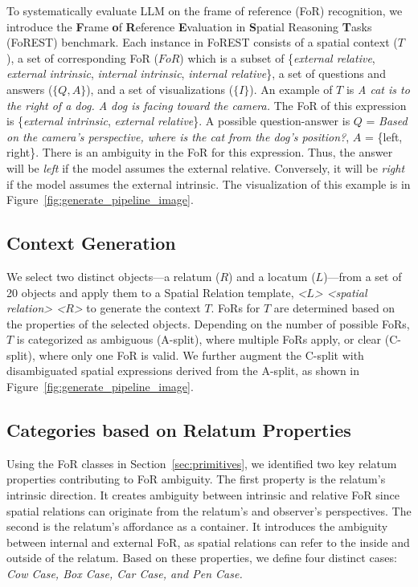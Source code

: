 
To systematically evaluate LLM on the frame of reference (FoR) recognition, 
we introduce the \textbf{F}rame \textbf{o}f \textbf{R}eference \textbf{E}valuation in \textbf{S}patial Reasoning \textbf{T}asks (FoREST) benchmark.
Each instance in FoREST consists of a spatial context ($T$), a set of corresponding FoR ($FoR$) which is a subset of \{\textit{external relative},  \textit{external intrinsic}, \textit{internal intrinsic}, \textit{internal relative}\}, a set of questions and answers ($\{Q,A\}$), and a set of visualizations ($\{I\}$).
An example of $T$ is \textit{A cat is to the right of a dog. A dog is facing toward the camera.}
The FoR of this expression is \{\textit{external intrinsic}, \textit{external relative}\}.
A possible question-answer is $Q$ = \textit{Based on the camera's perspective, where is the cat from the dog's position?}, $A$ = \{left, right\}. There is an ambiguity in the FoR for this expression.
Thus, the answer will be \textit{left} if the model assumes the external relative. Conversely, it will be \textit{right} if the model assumes the external intrinsic.
The visualization of this example is in Figure~\ref{fig:generate_pipeline_image}. 

\subsection{Context Generation}
We select two distinct objects—a relatum ($R$) and a locatum ($L$)—from a set of 20 objects and apply them to a Spatial Relation template,
\textit{<$L$> <spatial relation> <$R$>} to generate the context $T$.
FoRs for $T$ are determined based on the properties of the selected objects. Depending on the number of possible FoRs, $T$ is categorized as ambiguous (A-split), where multiple FoRs apply, or clear (C-split), where only one FoR is valid. 
We further augment the C-split with disambiguated spatial expressions derived from the A-split, as shown in Figure~\ref{fig:generate_pipeline_image}.

\subsection{Categories based on Relatum Properties} \label{sec:FoR_Relatum_scenario}
Using the FoR classes in Section~\ref{sec:primitives}, we identified two key relatum properties contributing to FoR ambiguity.
The first property is the relatum's intrinsic direction. 
It creates ambiguity between intrinsic and relative FoR since spatial relations can originate from the relatum's and observer's perspectives.
The second is the relatum's affordance as a container. 
It introduces the ambiguity between internal and external FoR, as spatial relations can refer to the inside and outside of the relatum. 
Based on these properties, we define four distinct cases: \textit{Cow Case, Box Case, Car Case, and Pen Case.}

